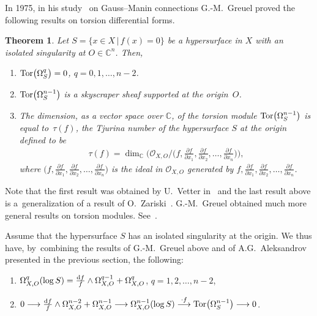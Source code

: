 \documentclass[10pt,a4paper]{amsart}
\numberwithin{equation}{section}
\newtheorem{Theorem}{Theorem}[section]
\begin{document}
In 1975, in his study~\cite{G} on Gauss--Manin connections G.-M.~Greuel proved the following results on torsion differential forms.

\begin{Theorem}
Let $ S = \{ x \in X \,|\, f(x) = 0 \} $ be a hypersurface in $X$
with an isolated singularity at $ O \in {\mathbb C}^n$.
Then,
\begin{enumerate}\itemsep=0pt
\item[$(i)$] $ {\rm Tor}\big(\Omega_S^{q}\big) = 0$, $q=0,1,\ldots,n-2$.

\item[$(ii)$] ${\rm Tor}\big(\Omega_S^{n-1}\big)$ is a skyscraper sheaf supported at the origin~$O$.

\item[$(iii)$] The dimension, as a vector space over ${\mathbb C}$, of the torsion module ${\rm Tor}\big(\Omega_S^{n-1}\big) $ is equal to~$\tau(f)$, the Tjurina number of the hypersurface $S$ at the origin defined to be
\begin{gather*}
 \tau(f) = \dim_{{\mathbb C}}\bigg({\mathcal O}_{X, O}\Big/\bigg(f, \frac{\partial f}{\partial x_1}, \frac{\partial f}{\partial x_2},\ldots,\frac{\partial f}{\partial x_n}\bigg)\bigg),
\end{gather*}
where
$ \big(f, \frac{\partial f}{\partial x_1}, \frac{\partial f}{\partial x_2},\ldots,
\frac{\partial f}{\partial x_n}\big) $
is the ideal in $ {\mathcal O}_{X,O} $ generated by
$f, \frac{\partial f}{\partial x_1}, \frac{\partial f}{\partial x_2}, \ldots, \frac{\partial f}{\partial x_n}$.
\end{enumerate}
\end{Theorem}

Note that the first result was obtained by U.~Vetter in~\cite{V} and the last result above is a~generalization of a result of O.~Zariski~\cite{Z}.
G.-M.~Greuel obtained much more general results on torsion modules. See~\cite[Proposition~1.11, p.~242]{G}.

Assume that the hypersurface $S$ has an isolated singularity at the origin.
We thus have, by~combining the results of G.-M.~Greuel above and of A.G.~Aleksandrov presented in the previous section, the following:
\begin{enumerate}\itemsep=0pt
\item[$(i)$]
$\Omega_{X,O}^{q}(\log S)= \frac{{\rm d}f}{f} \wedge \Omega_{X,O}^{q-1}+\Omega_{X,O}^{q}$, $q=1,2,\ldots, n-2$,

\item[$(ii)$]
$0 \longrightarrow\frac{{\rm d}f}{f} \wedge \Omega_{X,O}^{n-2} + \Omega_{X,O}^{n-1}\longrightarrow
\Omega_{X,O}^{n-1}(\log S) \stackrel{\cdot f}\longrightarrow {\rm Tor}\big(\Omega_{S}^{n-1}\big) \longrightarrow 0$.
\end{enumerate}
\end{document}
